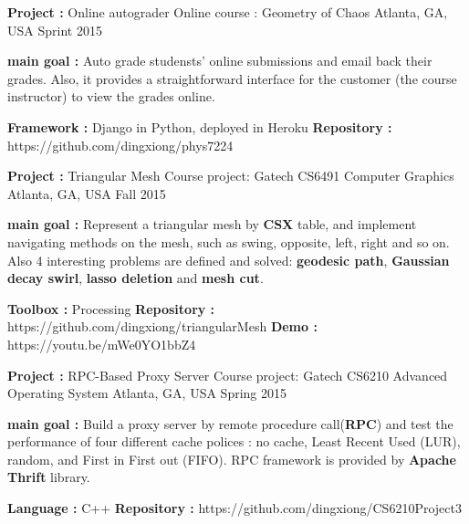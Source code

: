 


\begin{cventries}

\cventry
{\textbf{Project :} Online autograder} 
{Online course : Geometry of Chaos} 
{Atlanta, GA, USA} %
{Sprint 2015} %
{
  \begin{cvitems}
  \item {\textbf{main goal :} Auto grade studensts' online submissions and email back their grades. Also, 
      it provides a straightforward interface for the customer (the course instructor)
      to view the grades online.}
  \item {\textbf{Framework :} Django in Python, deployed in Heroku \quad
      \textbf{Repository :} {\color{red} https://github.com/dingxiong/phys7224} 
    }
  \end{cvitems}
}

\cventry
{\textbf{Project :} Triangular Mesh} 
{Course project: Gatech CS6491 Computer Graphics} 
{Atlanta, GA, USA} %
{Fall 2015} %
{
  \begin{cvitems}
  \item {\textbf{main goal :} Represent a triangular mesh by \textbf{CSX} table, and implement navigating
      methods on the mesh, such as swing, opposite, left, right and so on. Also 4 interesting problems
      are defined and solved: \textbf{geodesic path}, 
      \textbf{Gaussian decay swirl}, \textbf{lasso deletion} and \textbf{mesh cut}.}
  \item {\textbf{Toolbox :} Processing \quad
      \textbf{Repository :} {\color{red} https://github.com/dingxiong/triangularMesh}
      \quad
      \textbf{Demo : }  {\color{red} https://youtu.be/mWe0YO1bbZ4}}
  \end{cvitems}
}

\cventry
{\textbf{Project :} RPC-Based Proxy Server} 
{Course project: Gatech CS6210 Advanced Operating System} 
{Atlanta, GA, USA} %
{Spring 2015} %
{
  \begin{cvitems}
  \item {\textbf{main goal :} Build a proxy server by remote procedure call(\textbf{RPC}) and test
      the performance of four different cache polices : no cache, Least Recent Used (LUR), random,
      and First in First out (FIFO). RPC framework is provided by \textbf{Apache Thrift} library.
    }
  \item {\textbf{Language :} C++  \quad
      \textbf{Repository :} {\color{red} https://github.com/dingxiong/CS6210Project3}
    }
  \end{cvitems}
}


\end{cventries}
